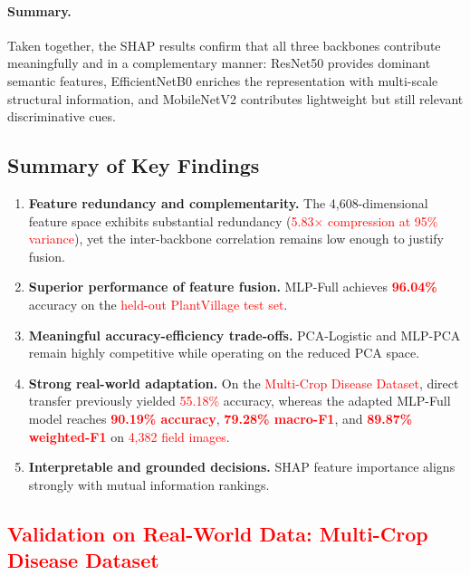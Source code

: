 \documentclass[pdflatex,sn-basic]{sn-jnl}
\begin{document}
\paragraph{Summary.}
Taken together, the SHAP results confirm that all three backbones contribute meaningfully and in a complementary manner: ResNet50 provides dominant semantic features, EfficientNetB0 enriches the representation with multi-scale structural information, and MobileNetV2 contributes lightweight but still relevant discriminative cues.

\subsection{Summary of Key Findings}
\label{subsec:summary_findings}

\begin{enumerate}
    \item \textbf{Feature redundancy and complementarity.} The 4,608-dimensional feature space exhibits substantial redundancy (\textcolor{red}{5.83$\times$ compression at 95\% variance}), yet the inter-backbone correlation remains low enough to justify fusion.
    \item \textbf{Superior performance of feature fusion.} MLP-Full achieves \textcolor{red}{\textbf{96.04\%}} accuracy on the \textcolor{red}{held-out PlantVillage test set}.
    \item \textbf{Meaningful accuracy-efficiency trade-offs.} PCA-Logistic and MLP-PCA remain highly competitive while operating on the reduced PCA space.
    \item \textbf{Strong real-world adaptation.} On the \textcolor{red}{Multi-Crop Disease Dataset}, direct transfer previously yielded \textcolor{red}{55.18\%} accuracy, whereas the adapted MLP-Full model reaches \textcolor{red}{\textbf{90.19\% accuracy}}, \textcolor{red}{\textbf{79.28\% macro-F1}}, and \textcolor{red}{\textbf{89.87\% weighted-F1}} on \textcolor{red}{4,382 field images}.
    \item \textbf{Interpretable and grounded decisions.} SHAP feature importance aligns strongly with mutual information rankings.
\end{enumerate}

\subsection{\textcolor{red}{Validation on Real-World Data: Multi-Crop Disease Dataset}}
\label{subsec:multicrop}
\end{document}
